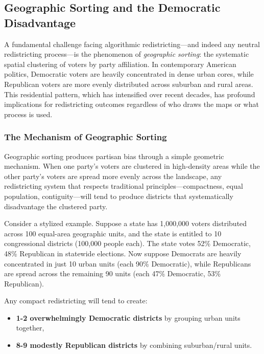 
\subsection{Geographic Sorting and the Democratic Disadvantage}
\label{sec:geographic_sorting}

A fundamental challenge facing algorithmic redistricting---and indeed any neutral redistricting process---is the phenomenon of \textit{geographic sorting}: the systematic spatial clustering of voters by party affiliation. In contemporary American politics, Democratic voters are heavily concentrated in dense urban cores, while Republican voters are more evenly distributed across suburban and rural areas. This residential pattern, which has intensified over recent decades, has profound implications for redistricting outcomes regardless of who draws the maps or what process is used.

\subsubsection{The Mechanism of Geographic Sorting}
\label{sec:sorting_mechanism}

Geographic sorting produces partisan bias through a simple geometric mechanism. When one party's voters are clustered in high-density areas while the other party's voters are spread more evenly across the landscape, any redistricting system that respects traditional principles---compactness, equal population, contiguity---will tend to produce districts that systematically disadvantage the clustered party.

Consider a stylized example. Suppose a state has 1,000,000 voters distributed across 100 equal-area geographic units, and the state is entitled to 10 congressional districts (100,000 people each). The state votes 52\% Democratic, 48\% Republican in statewide elections. Now suppose Democrats are heavily concentrated in just 10 urban units (each 90\% Democratic), while Republicans are spread across the remaining 90 units (each 47\% Democratic, 53\% Republican).

Any compact redistricting will tend to create:
\begin{itemize}
\item \textbf{1-2 overwhelmingly Democratic districts} by grouping urban units together,
\item \textbf{8-9 modestly Republican districts} by combining suburban/rural units.
\end{itemize}

